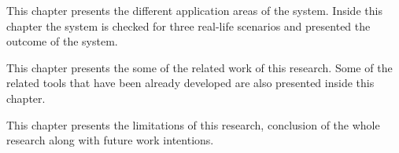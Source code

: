 \noindent  This chapter presents the different application areas of the system. Inside this chapter the system is checked for three real-life scenarios and presented the outcome of the system. 

  \vspace{1mm}

\noindent  This chapter presents the some of the related work of this research. Some of the related tools that have been already developed are also presented inside this chapter.



  \vspace{1mm}

\noindent  This chapter presents the limitations of this research, conclusion of the whole research along with future work intentions.